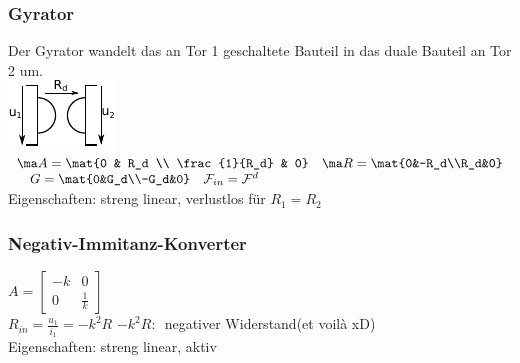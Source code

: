 \documentclass[fs, footer]{latex4ei}
\begin{document}
\begin{multicols*}{4}
		\subsubsection{Gyrator}
		Der Gyrator wandelt das an Tor 1 geschaltete Bauteil in das duale Bauteil an Tor 2 um.\\
		\includegraphics[scale=.8]{./img/symb/symb_gyrator.pdf}
		$\begin{array}{l}
			\ma A=\mat{0 & R_d \\ \frac{1}{R_d} & 0}\mathrm{\quad}\ma R = \mat{0&-R_d\\R_d&0}\\ \mathrm{\quad} G = \mat{0&G_d\\-G_d&0}\mathrm{\quad}\mathcal F_{in}=\mathcal F^d
		\end{array}$\\
		Eigenschaften: streng linear, verlustlos für $R_1=R_2$\\

		\subsubsection{Negativ-Immitanz-Konverter}
		$A=\begin{bmatrix} -k & 0 \\ 0 & \frac{1}{k} \end{bmatrix}$\\
		$R_{in}=\frac{u_1}{i_1}=-k^2R$ \quad $-k^2 R:$\ negativer Widerstand(et voilà xD)\\
		Eigenschaften: streng linear, aktiv



\end{multicols*}
\end{document}
